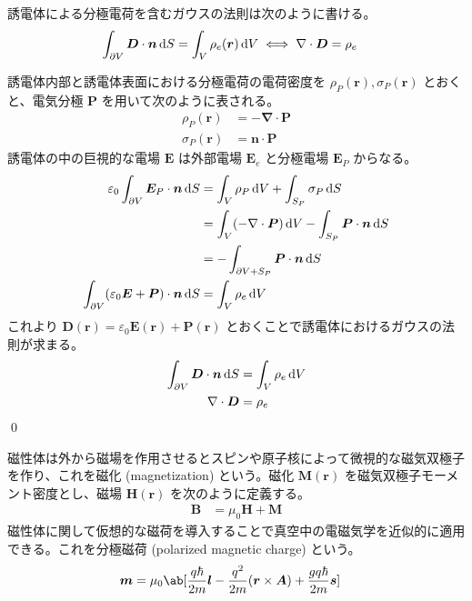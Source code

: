\documentclass[uplatex,dvipdfmx,a4paper,11pt]{jlreq}
\makeatletter
\newcommand{\EE}{\bm{E}}
\newcommand{\BB}{\bm{B}}
\newcommand{\DD}{\bm{D}}
\newcommand{\HH}{\bm{H}}
\newcommand{\PP}{\bm{P}}
\newcommand{\MM}{\bm{M}}
\renewcommand{\AA}{\bm{A}}
\newcommand{\rr}{\bm{r}}
\newcommand{\vnabla}{\mathbf{\nabla}}
\numberwithin{equation}{section}
\theoremstyle{definition}
\renewenvironment{proof}[1][\proofname]{\par
  \normalfont
  \topsep6\p@\@plus6\p@ \trivlist
  \item[\hskip\labelsep{\bfseries #1}\@addpunct{\bfseries}]\ignorespaces\quad\par
}{%
  \qed\endtrivlist\@endpefalse
}
\renewcommand\proofname{証明}
\makeatother
\begin{document}
\begin{theorem}[誘電体のガウスの法則]
  誘電体による分極電荷を含むガウスの法則は次のように書ける。
  \begin{align}
    \int_{\partial V}\DD\cdot\bm{n}\dl{S} & = \int_V\rho_e(\rr)\dl{V} \iff \vnabla\cdot\DD = \rho_e
  \end{align}
\end{theorem}
\begin{proof}
  誘電体内部と誘電体表面における分極電荷の電荷密度を $\rho_P(\rr), \sigma_P(\rr)$ とおくと、電気分極 $\bm{P}$ を用いて次のように表される。
  \begin{align}
    \rho_P(\rr)   & = - \vnabla\cdot\PP \\
    \sigma_P(\rr) & = \bm{n}\cdot\PP
  \end{align}
  誘電体の中の巨視的な電場 $\EE$ は外部電場 $\EE_e$ と分極電場 $\EE_P$ からなる。
  \begin{align}
    \varepsilon_0\int_{\partial V}\EE_P\cdot\bm{n}\dl{S}       & = \int_V\rho_P\dl{V} + \int_{S_P}\sigma_P\dl{S}                         \\
                                                               & = \int_V(-\vnabla\cdot\bm{P})\dl{V} - \int_{S_P}\bm{P}\cdot\bm{n}\dl{S} \\
                                                               & = - \int_{\partial V + S_P}\bm{P}\cdot\bm{n}\dl{S}                      \\
    \int_{\partial V}(\varepsilon_0\EE + \PP)\cdot\bm{n}\dl{S} & = \int_{V}\rho_e\dl{V}
  \end{align}
  これより $\DD(\rr) = \varepsilon_0\EE(\rr) + \bm{P}(\rr)$ とおくことで誘電体におけるガウスの法則が求まる。
  \begin{align}
    \int_{\partial V}\DD\cdot\bm{n}\dl{S} & = \int_{V}\rho_e\dl{V} \\
    \vnabla\cdot\DD                       & = \rho_e
  \end{align}
\end{proof}

\begin{definition}[磁性体]
  磁性体は外から磁場を作用させるとスピンや原子核によって微視的な磁気双極子を作り、これを磁化 (magnetization) という。磁化 $\MM(\rr)$ を磁気双極子モーメント密度とし、磁場 $\HH(\rr)$ を次のように定義する。
  \begin{align}
    \BB & = \mu_0\HH + \MM
  \end{align}
  磁性体に関して仮想的な磁荷を導入することで真空中の電磁気学を近似的に適用できる。これを分極磁荷 (polarized magnetic charge) という。
  \begin{align}
    \bm{m} & = \mu_0\ab[\frac{q\hbar}{2m}\bm{l} - \frac{q^2}{2m}(\rr\times\AA) + \frac{gq\hbar}{2m}\bm{s}]
  \end{align}
\end{definition}
\end{document}
